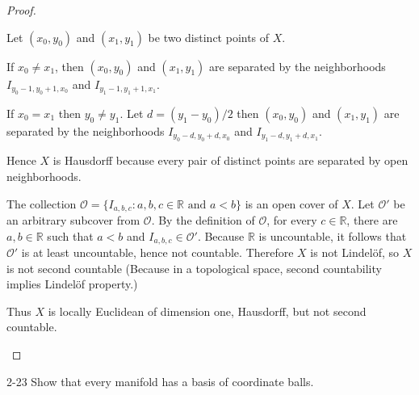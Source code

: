 \begin{proof}
\begin{enumerate}[label={(\alph*)}]
		      Let $(x_{0}, y_{0})$ and $(x_{1}, y_{1})$ be two distinct points of $X$.

		      If $x_{0}\ne x_{1}$, then $(x_{0}, y_{0})$ and $(x_{1}, y_{1})$ are separated by the neighborhoods $I_{y_{0}-1, y_{0}+1, x_{0}}$ and $I_{y_{1}-1, y_{1}+1, x_{1}}$.

		      If $x_{0} = x_{1}$ then $y_{0}\ne y_{1}$. Let $d = (y_{1} - y_{0})/2$ then $(x_{0}, y_{0})$ and $(x_{1}, y_{1})$ are separated by the neighborhoods $I_{y_{0} - d, y_{0}+d, x_{0}}$ and $I_{y_{1}-d, y_{1}+d, x_{1}}$.

		      Hence $X$ is Hausdorff because every pair of distinct points are separated by open neighborhoods.

		      The collection $\mathcal{O} = \{ I_{a,b,c}: a, b, c\in\mathbb{R} \text{ and } a < b \}$ is an open cover of $X$. Let $\mathcal{O}'$ be an arbitrary subcover from $\mathcal{O}$. By the definition of $\mathcal{O}$, for every $c\in\mathbb{R}$, there are $a, b\in\mathbb{R}$ such that $a < b$ and $I_{a,b,c}\in\mathcal{O}'$. Because $\mathbb{R}$ is uncountable, it follows that $\mathcal{O}'$ is at least uncountable, hence not countable. Therefore $X$ is not Lindelöf, so $X$ is not second countable (Because in a topological space, second countability implies Lindelöf property.)

		      Thus $X$ is locally Euclidean of dimension one, Hausdorff, but not second countable.
	\end{enumerate}
\end{proof}

\begin{problem}{2-23}\label{problem:2-23}
Show that every manifold has a basis of coordinate balls.
\end{problem}


